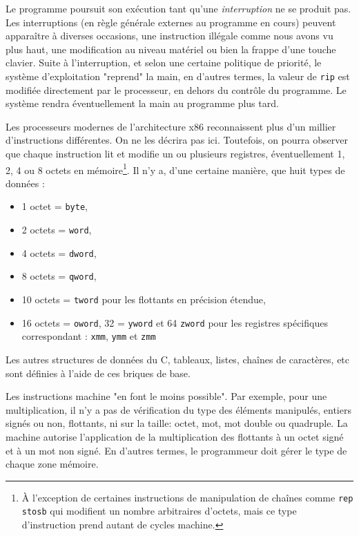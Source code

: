 \documentclass{book}
\newcommand{\C}{\textsc{C}\xspace}
\newcommand{\rip}{{\tt rip}\xspace}
\begin{document}
{Le programme  poursuit son exécution tant qu'une \emph{interruption} ne se produit pas. Les interruptions (en règle générale externes au programme en cours) peuvent apparaître à diverses occasions, une instruction illégale comme nous avons vu plus haut, une modification au niveau matériel ou bien la frappe d'une touche clavier. Suite à l'interruption, et selon une certaine politique de priorité, le système d'exploitation "reprend" la main, en d'autres termes, la valeur de \rip est modifiée directement par le processeur, en dehors du contrôle du programme. Le système rendra éventuellement la main au programme plus tard. 

Les  processeurs modernes de l'architecture {\sc x86} reconnaissent plus d'un millier d'instructions différentes. On ne les décrira pas ici. Toutefois, on pourra observer que chaque instruction lit et modifie un ou plusieurs registres, éventuellement 1, 2, 4 ou 8 octets en mémoire\footnote{\`A l'exception de certaines instructions de manipulation de chaînes comme {\tt rep stosb} qui modifient un nombre arbitraires d'octets, mais ce type d'instruction prend autant de cycles machine.}.  Il n'y a, d'une certaine manière, que huit types de données : 
\begin{itemize}
	\item 1 octet = {\tt byte}, 
	\item 2 octets = {\tt word},
	\item 4 octets = {\tt dword},
	\item 8 octets = {\tt qword},
	\item 10 octets = {\tt tword} pour les flottants en précision étendue,
	\item 16 octets = {\tt oword}, 32 = {\tt yword} et 64 {\tt zword} pour les registres spécifiques correspondant : {\tt xmm}, {\tt ymm} et {\tt zmm}
\end{itemize}

Les autres structures de données du \C, tableaux, listes, chaînes de caractères, etc sont définies à l'aide de ces briques de base.

Les instructions machine "en font le moins possible". Par exemple, pour une multiplication, il n'y a pas de vérification du type des éléments manipulés, entiers signés ou non, flottants, ni sur la taille: octet, mot, mot double ou quadruple. La machine autorise l'application  de la multiplication des flottants à un octet signé et à un mot non signé.  En d'autres termes, le programmeur doit gérer le type de chaque zone mémoire.

}
\end{document}
